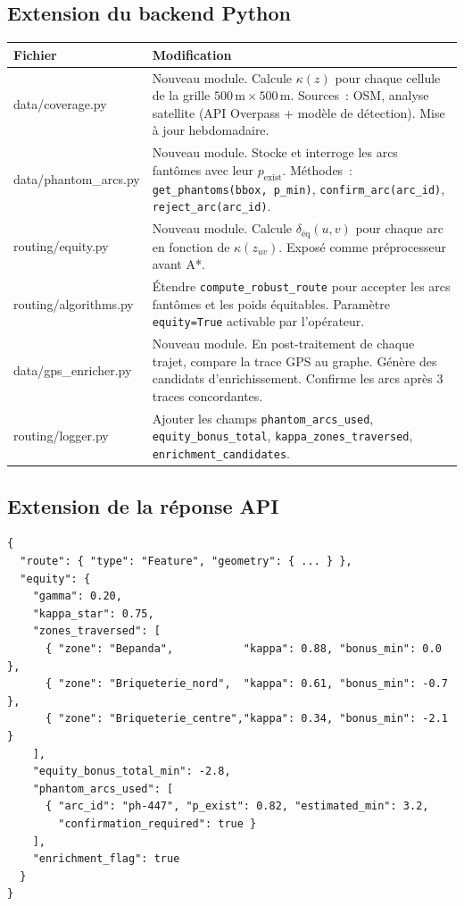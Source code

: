 \documentclass[12pt,a4paper]{article}
\theoremstyle{definition}
\theoremstyle{remark}
\begin{document}
\subsection{Extension du backend Python}

\begin{center}
\begin{tabular}{>{\ttfamily}p{4.5cm} p{8.5cm}}
  \toprule
  \textbf{Fichier} & \textbf{Modification} \\
  \midrule
  data/coverage.py &
    Nouveau module. Calcule $\kappa(z)$ pour chaque cellule de la grille
    $500\,\text{m} \times 500\,\text{m}$. Sources~: OSM, analyse satellite
    (API Overpass + modèle de détection). Mise à jour hebdomadaire. \\[0.4em]
  data/phantom\_arcs.py &
    Nouveau module. Stocke et interroge les arcs fantômes avec leur
    $p_\text{exist}$. Méthodes~: \texttt{get\_phantoms(bbox, p\_min)},
    \texttt{confirm\_arc(arc\_id)}, \texttt{reject\_arc(arc\_id)}. \\[0.4em]
  routing/equity.py &
    Nouveau module. Calcule $\delta_\text{éq}(u,v)$ pour chaque arc
    en fonction de $\kappa(z_{uv})$. Exposé comme préprocesseur avant A*. \\[0.4em]
  routing/algorithms.py &
    Étendre \texttt{compute\_robust\_route} pour accepter les arcs
    fantômes et les poids équitables. Paramètre \texttt{equity=True}
    activable par l'opérateur. \\[0.4em]
  data/gps\_enricher.py &
    Nouveau module. En post-traitement de chaque trajet, compare la
    trace GPS au graphe. Génère des candidats d'enrichissement.
    Confirme les arcs après 3 traces concordantes. \\[0.4em]
  routing/logger.py &
    Ajouter les champs \texttt{phantom\_arcs\_used},
    \texttt{equity\_bonus\_total}, \texttt{kappa\_zones\_traversed},
    \texttt{enrichment\_candidates}. \\
  \bottomrule
\end{tabular}
\end{center}

\subsection{Extension de la réponse API}

\begin{verbatim}
{
  "route": { "type": "Feature", "geometry": { ... } },
  "equity": {
    "gamma": 0.20,
    "kappa_star": 0.75,
    "zones_traversed": [
      { "zone": "Bepanda",           "kappa": 0.88, "bonus_min": 0.0 },
      { "zone": "Briqueterie_nord",  "kappa": 0.61, "bonus_min": -0.7 },
      { "zone": "Briqueterie_centre","kappa": 0.34, "bonus_min": -2.1 }
    ],
    "equity_bonus_total_min": -2.8,
    "phantom_arcs_used": [
      { "arc_id": "ph-447", "p_exist": 0.82, "estimated_min": 3.2,
        "confirmation_required": true }
    ],
    "enrichment_flag": true
  }
}
\end{verbatim}
\end{document}
